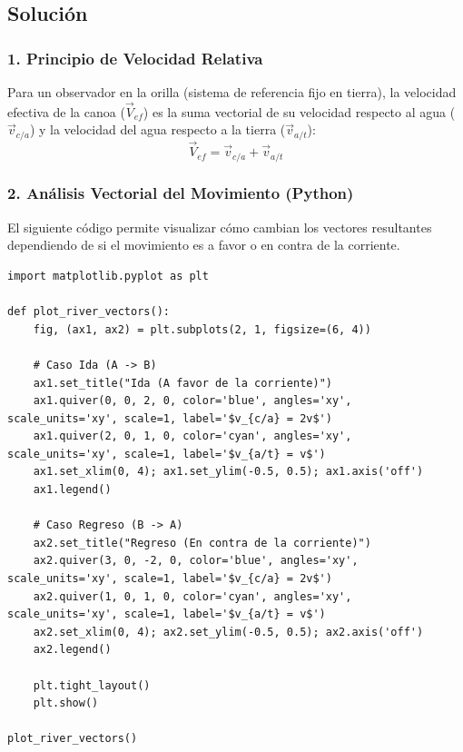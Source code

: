 \documentclass[12pt, a4paper]{article}
\begin{document}
\subsection*{Solución}

\subsubsection*{1. Principio de Velocidad Relativa}

Para un observador en la orilla (sistema de referencia fijo en tierra), la velocidad efectiva de la canoa ($\vec{V}_{ef}$) es la suma vectorial de su velocidad respecto al agua ($\vec{v}_{c/a}$) y la velocidad del agua respecto a la tierra ($\vec{v}_{a/t}$):
\begin{equation}
    \vec{V}_{ef} = \vec{v}_{c/a} + \vec{v}_{a/t}
\end{equation}

\subsubsection*{2. Análisis Vectorial del Movimiento (Python)}

El siguiente código permite visualizar cómo cambian los vectores resultantes dependiendo de si el movimiento es a favor o en contra de la corriente.



\begin{lstlisting}
import matplotlib.pyplot as plt

def plot_river_vectors():
    fig, (ax1, ax2) = plt.subplots(2, 1, figsize=(6, 4))
    
    # Caso Ida (A -> B)
    ax1.set_title("Ida (A favor de la corriente)")
    ax1.quiver(0, 0, 2, 0, color='blue', angles='xy', scale_units='xy', scale=1, label='$v_{c/a} = 2v$')
    ax1.quiver(2, 0, 1, 0, color='cyan', angles='xy', scale_units='xy', scale=1, label='$v_{a/t} = v$')
    ax1.set_xlim(0, 4); ax1.set_ylim(-0.5, 0.5); ax1.axis('off')
    ax1.legend()

    # Caso Regreso (B -> A)
    ax2.set_title("Regreso (En contra de la corriente)")
    ax2.quiver(3, 0, -2, 0, color='blue', angles='xy', scale_units='xy', scale=1, label='$v_{c/a} = 2v$')
    ax2.quiver(1, 0, 1, 0, color='cyan', angles='xy', scale_units='xy', scale=1, label='$v_{a/t} = v$')
    ax2.set_xlim(0, 4); ax2.set_ylim(-0.5, 0.5); ax2.axis('off')
    ax2.legend()
    
    plt.tight_layout()
    plt.show()

plot_river_vectors()
\end{lstlisting}
\end{document}
